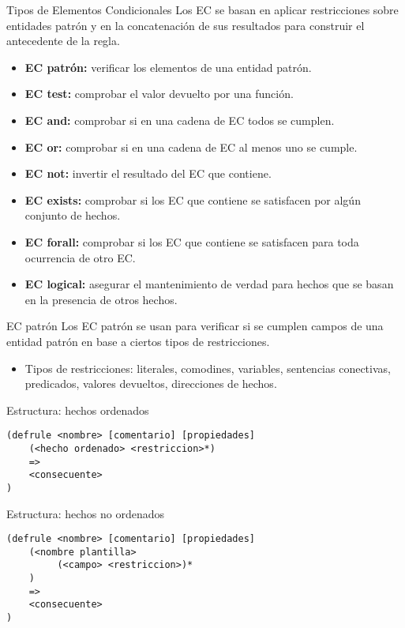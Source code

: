 \documentclass[usenames,dvipsnames,aspectratio=169]{beamer}
\begin{document}
\begin{frame}{Tipos de Elementos Condicionales}
	Los EC se basan en aplicar restricciones sobre entidades patrón y en la concatenación de sus resultados para construir el antecedente de la regla.
	\begin{itemize}
		\item \textbf{EC patrón:} verificar los elementos de una entidad patrón.
		\item \textbf{EC test:} comprobar el valor devuelto por una función.
		\item \textbf{EC and:} comprobar si en una cadena de EC todos se cumplen.
		\item \textbf{EC or:} comprobar si en una cadena de EC al menos uno se cumple.
		\item \textbf{EC not:} invertir el resultado del EC que contiene.
		\item \textbf{EC exists:} comprobar si los EC que contiene se satisfacen por algún conjunto de hechos.
		\item \textbf{EC forall:} comprobar si los EC que contiene se satisfacen para toda ocurrencia de otro EC.
		\item \textbf{EC logical:} asegurar el mantenimiento de verdad para hechos que se basan en la presencia de otros hechos.
	\end{itemize}
\end{frame}

\begin{frame}[fragile]{EC patrón}
	Los EC patrón se usan para verificar si se cumplen campos de una entidad patrón en base a ciertos tipos de restricciones.
	\begin{itemize}
		\item Tipos de restricciones: literales, comodines, variables, sentencias conectivas, predicados, valores devueltos, direcciones de hechos.
	\end{itemize}
	\hfil
	\begin{minipage}{.48\textwidth}
		\footnotesize
		\begin{block}{Estructura: hechos ordenados}
			\begin{verbatim}
(defrule <nombre> [comentario] [propiedades]
    (<hecho ordenado> <restriccion>*)
    =>
    <consecuente>
)
			\end{verbatim}
		\end{block}
	\end{minipage}
	\hfill
	\begin{minipage}{.48\textwidth}
		\footnotesize
		\begin{block}{Estructura: hechos no ordenados}
			\begin{verbatim}
(defrule <nombre> [comentario] [propiedades]
    (<nombre plantilla>
         (<campo> <restriccion>)*
    )
    =>
    <consecuente>
)
			\end{verbatim}
		\end{block}
	\end{minipage}
\end{frame}
\end{document}
